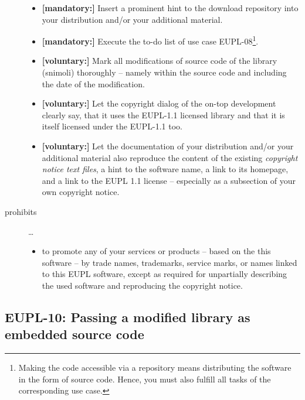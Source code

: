 \begin{description}
\begin{itemize}
  \item \textbf{[mandatory:]} Insert a prominent hint to the download repository
  into your distribution and/or your additional material.

  \item \textbf{[mandatory:]} Execute the to-do list of use case EUPL-08\footnote{
  Making the code accessible via a repository means distributing the software in
  the form of source code. Hence, you must also fulfill all tasks of the
  corresponding use case.}.
    
  \item \textbf{[voluntary:]} Mark all modifications of source code of the
  library (snimoli) thoroughly -- namely within the source code and including
  the date of the modification.
  
  \item \textbf{[voluntary:]} Let the copyright dialog of the on-top development
  clearly say, that it uses the EUPL-1.1 licensed library and that it is itself
  licensed under the EUPL-1.1 too.
  
  \item \textbf{[voluntary:]} Let the documentation of your distribution and/or
  your additional material  also reproduce the content of the existing
  \emph{copyright notice text files}, a hint to the software name, a link to its
  homepage, and a link to the EUPL 1.1 license -- especially as a subsection of
  your own copyright notice.
  
\end{itemize}

\item[prohibits] \ldots
\begin{itemize}
  \item to promote any of your services or products -- based on the this software
  -- by trade names, trademarks, service marks, or names linked to this EUPL
  software, except as required for unpartially describing the used software and
  reproducing the copyright notice.
\end{itemize}

\end{description}

\subsection{EUPL-10: Passing a modified library as embedded source code}
\label{OSUC-10S-EUPL}

